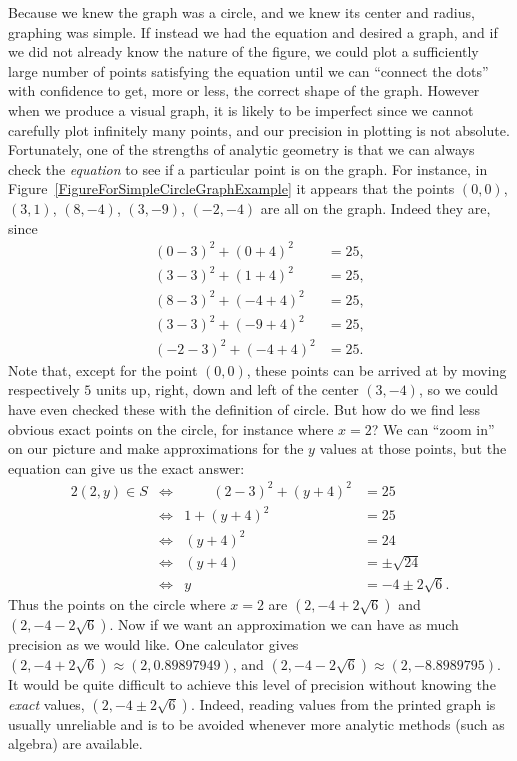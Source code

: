 Because we knew the graph was a circle, and we knew its center and
radius, graphing was simple.  If instead we had the equation
and desired a graph, and if we did not already know the nature of the
figure, we could plot a sufficiently large number of points 
satisfying the equation until we can ``connect the dots'' with
confidence to get, more or less,  the correct shape of the graph.  However
when we produce a visual graph, it is likely to be imperfect since
we cannot carefully plot infinitely many points, and our 
precision in plotting is not absolute.  Fortunately, one of the
strengths of analytic geometry is that we can always check the
{\it equation} to see if a particular point is on the graph.    
For instance, in Figure~\ref{FigureForSimpleCircleGraphExample} it appears
that the points $(0,0)$, $(3,1)$, $(8,-4)$, $(3,-9)$, $(-2,-4)$
are all on the graph. Indeed they are, since
\begin{align*}
(0-3)^2+(0+4)^2&=25,\\
(3-3)^2+(1+4)^2&=25,\\
(8-3)^2+(-4+4)^2&=25,\\
(3-3)^2+(-9+4)^2&=25,\\
(-2-3)^2+(-4+4)^2&=25.\end{align*} 
Note that, except for the point $(0,0)$, these points can be 
arrived at by moving respectively $5$ units up, right, down and left of
the center $(3,-4)$, so we could have even checked these
with the definition of circle.  
But how do we find less obvious exact points on the circle, 
for instance where $x=2$?  We can ``zoom in'' on our picture and 
make approximations for the $y$ values at those points,
but the equation can give us the exact answer:
\begin{alignat*}{2} 
(2,y)\in S&\iff &\qquad (2-3)^2+(y+4)^2&=25\\
&\iff&1+(y+4)^2&=25\\
&\iff&(y+4)^2&=24\\
&\iff&(y+4)&=\pm\sqrt{24}\\
&\iff&y&=-4\pm2\sqrt6.\end{alignat*} 
Thus the points on the circle where $x=2$ are
$\left(2,-4+2\sqrt6\right)$ and $\left(2,-4-2\sqrt6\right)$.
Now if we want an approximation we can have as much precision
as we would like.  One calculator gives
$\left(2,-4+2\sqrt6\right)\approx(2,0.89897949)$,
 and $\left(2,-4-2\sqrt6\right)\approx(2,-8.8989795)$. 
It would be quite difficult to achieve this level of precision
without knowing the {\it exact} values, $\left(2,-4\pm2\sqrt6\right)$.
Indeed, reading values from the printed graph is 
usually unreliable and is to be avoided whenever more
analytic methods (such as algebra) are available.\footnotemark
{}  

